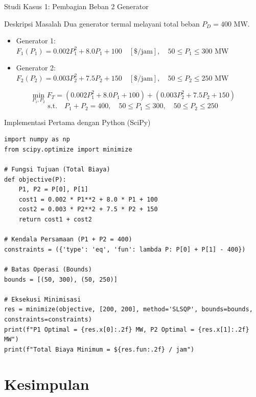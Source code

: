 \documentclass[10pt,aspectratio=169]{beamer}
\begin{document}
\begin{frame}{Studi Kasus 1: Pembagian Beban 2 Generator}
    \begin{block}{Deskripsi Masalah}
        Dua generator termal melayani total beban $P_D = 400\text{ MW}$.
        \begin{itemize}
            \item Generator 1: $F_1(P_1) = 0.002 P_1^2 + 8.0 P_1 + 100 \quad [\text{\$/jam}], \quad 50 \le P_1 \le 300\text{ MW}$
            \item Generator 2: $F_2(P_2) = 0.003 P_2^2 + 7.5 P_2 + 150 \quad [\text{\$/jam}], \quad 50 \le P_2 \le 250\text{ MW}$
        \end{itemize}
    \end{block}

    \begin{tcolorbox}[colback=white,colframe=darkgreen,title=\textbf{Model Optimisasi Matematis}]
        \[
            \min_{P_1, P_2} F_T = (0.002 P_1^2 + 8.0 P_1 + 100) + (0.003 P_2^2 + 7.5 P_2 + 150)
        \]
        \[
            \text{s.t.} \quad P_1 + P_2 = 400, \quad 50 \le P_1 \le 300, \quad 50 \le P_2 \le 250
        \]
    \end{tcolorbox}
\end{frame}

\begin{frame}[fragile]{Implementasi Pertama dengan Python (SciPy)}
\begin{lstlisting}
import numpy as np
from scipy.optimize import minimize

# Fungsi Tujuan (Total Biaya)
def objective(P):
    P1, P2 = P[0], P[1]
    cost1 = 0.002 * P1**2 + 8.0 * P1 + 100
    cost2 = 0.003 * P2**2 + 7.5 * P2 + 150
    return cost1 + cost2

# Kendala Persamaan (P1 + P2 = 400)
constraints = ({'type': 'eq', 'fun': lambda P: P[0] + P[1] - 400})

# Batas Operasi (Bounds)
bounds = [(50, 300), (50, 250)]

# Eksekusi Minimisasi
res = minimize(objective, [200, 200], method='SLSQP', bounds=bounds, constraints=constraints)
print(f"P1 Optimal = {res.x[0]:.2f} MW, P2 Optimal = {res.x[1]:.2f} MW")
print(f"Total Biaya Minimum = ${res.fun:.2f} / jam")
\end{lstlisting}
\end{frame}

\section{Kesimpulan}
\end{document}
